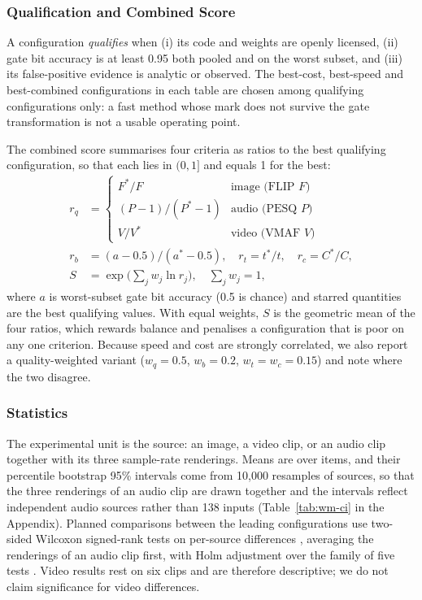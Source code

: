 \subsubsection{Qualification and Combined Score}
A configuration \emph{qualifies} when (i) its code and weights are openly licensed, (ii) gate bit accuracy is at least 0.95 both pooled and on the worst subset, and (iii) its false-positive evidence is analytic or observed. The best-cost, best-speed and best-combined configurations in each table are chosen among qualifying configurations only: a fast method whose mark does not survive the gate transformation is not a usable operating point.

The combined score summarises four criteria as ratios to the best qualifying configuration, so that each lies in $(0,1]$ and equals 1 for the best:
\begin{align}
r_q &= \begin{cases} F^{*}/F & \text{image (FLIP } F\text{)}\\ (P-1)/(P^{*}-1) & \text{audio (PESQ } P\text{)} \\ V/V^{*} & \text{video (VMAF } V\text{)}\end{cases}\nonumber\\
r_b &= (a-0.5)/(a^{*}-0.5),\quad r_t = t^{*}/t,\quad r_c = C^{*}/C,\nonumber\\
S &= \exp\Big(\sum_{j} w_j \ln r_j\Big),\quad \sum_j w_j = 1,
\end{align}
where $a$ is worst-subset gate bit accuracy (0.5 is chance) and starred quantities are the best qualifying values. With equal weights, $S$ is the geometric mean of the four ratios, which rewards balance and penalises a configuration that is poor on any one criterion. Because speed and cost are strongly correlated, we also report a quality-weighted variant ($w_q=0.5$, $w_b=0.2$, $w_t=w_c=0.15$) and note where the two disagree.

\subsubsection{Statistics}
\label{sec:wm-stats}
The experimental unit is the source: an image, a video clip, or an audio clip together with its three sample-rate renderings. Means are over items, and their percentile bootstrap 95\% intervals come from 10{,}000 resamples of sources, so that the three renderings of an audio clip are drawn together and the intervals reflect  independent audio sources rather than 138 inputs (Table~\ref{tab:wm-ci} in the Appendix). Planned comparisons between the leading configurations use two-sided Wilcoxon signed-rank tests on per-source differences \cite{wilcoxon1945}, averaging the renderings of an audio clip first, with Holm adjustment over the family of five tests \cite{holm1979}. Video results rest on six clips and are therefore descriptive; we do not claim significance for video differences.

